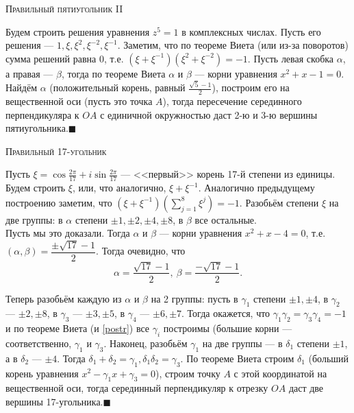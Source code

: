 \documentclass[a4paper,12pt]{article}
\newcommand*{\QEDA}{\hfill\ensuremath{\blacksquare}}
\newcounter{problems}
\newcommand{\zs}[1]{\refstepcounter{problems}{\bf Упражнение \arabic{problems} (#1 балла).}}
\begin{document}
\centerline{\scshape Правильный пятиугольник II}
Будем строить решения уравнения $z^5=1$ в комплексных числах. Пусть его решения --- $1,\xi,\xi^2,\xi^{-2},\xi^{-1}$. Заметим, что по теореме Виета (или из-за поворотов) сумма решений равна 0, т.е. $(\xi+\xi^{-1})(\xi^2+\xi^{-2})=-1$. Пусть левая скобка $\alpha$, а правая --- $\beta$, тогда по теореме Виета $\alpha$ и $\beta$ --- корни уравнения $x^2+x-1=0$. Найдём $\alpha$ (положительный корень, равный $\frac{\sqrt5-1}2$), построим его на вещественной оси (пусть это точка $A$), тогда пересечение серединного перпендикуляра к $OA$ с единичной окружностью даст 2-ю и 3-ю вершины пятиугольника.\QEDA\\

\centerline{\scshape Правильный 17-угольник}
Пусть $\xi=\cos\frac{2\pi}{17} + i\sin\frac{2\pi}{17}$ --- <<первый>> корень 17-й степени из единицы. Будем строить 
$\xi$, или, что аналогично, $\xi+\xi^{-1}$. Аналогично предыдущему построению заметим, что $(\xi+\xi^{-1})(\sum\limits_{j=1}^8 \xi^j)=-1$. Разобьём степени $\xi$ на две группы: в $\alpha$ степени $\pm1,\pm2,\pm4,\pm8$, в $\beta$ все остальные.\\


Пусть мы это доказали. Тогда $\alpha$ и $\beta$ --- корни уравнения $x^2+x-4=0$, т.е. $(\alpha,\beta)=\dfrac{\pm\sqrt{17}-1}2$. Тогда очевидно, что \[
	\alpha=\dfrac{\sqrt{17}-1}2,\ \beta=\dfrac{-\sqrt{17}-1}2
.\]


Теперь разобьём каждую из $\alpha$ и $\beta$ на 2 группы: пусть в $\gamma_1$ степени $\pm1,\pm4$, в $\gamma_2$ --- $\pm2,\pm8$, в $\gamma_3$ --- $\pm3,\pm5$, в $\gamma_4$ --- $\pm6,\pm7$. Тогда окажется, что $\gamma_1\gamma_2=\gamma_3\gamma_4=-1$ и по теореме Виета (и \ref{postr}) все $\gamma_i$ построимы (большие корни --- соответственно, $\gamma_1$ и $\gamma_3$. Наконец, разобьём $\gamma_1$ на две группы --- в $\delta_1$ степени $\pm1$, а в $\delta_2$ --- $\pm4$. Тогда $\delta_1+\delta_2=\gamma_1,\delta_1\delta_2=\gamma_3$. По теореме Виета строим $\delta_1$ (больший корень уравнения $x^2-\gamma_1x+\gamma_3=0$), строим точку $A$ с этой координатой на вещественной оси, тогда серединный перпендикуляр к отрезку $OA$ даст две вершины 17-угольника.\QEDA\\
\end{document}
